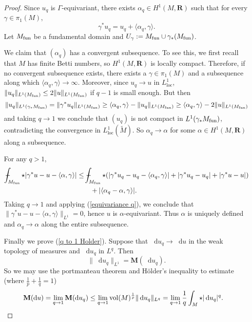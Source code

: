 \documentclass[reqno,11pt]{amsart}
\newcommand{\RR}{\mathbf{R}}
\newcommand*\dif{\mathop{}\!\mathrm{d}}
\newcommand{\vol}{\mathrm{vol}}
\newcommand{\Mass}{\mathbf M}
\newcommand{\loc}{\mathrm{loc}}
\theoremstyle{definition}
\numberwithin{equation}{section}
\def\Xint#1{\mathchoice
{\XXint\displaystyle\textstyle{#1}}%
{\XXint\textstyle\scriptstyle{#1}}%
{\XXint\scriptstyle\scriptscriptstyle{#1}}%
{\XXint\scriptscriptstyle\scriptscriptstyle{#1}}%
\!\int}
\def\XXint#1#2#3{{\setbox0=\hbox{$#1{#2#3}{\int}$ }
\vcenter{\hbox{$#2#3$ }}\kern-.6\wd0}}
\def\dashint{\Xint-}
\begin{document}
\begin{proof}
Since $u_q$ is $\Gamma$-equivariant, there exists $\alpha_q \in H^1(M, \RR)$ such that for every $\gamma \in \pi_1(M)$,
\begin{equation}\label{equivariance q}
	\gamma^* u_q = u_q + \langle \alpha_q, \gamma\rangle.
\end{equation}
Let $M_{\rm fun}$ be a fundamental domain and $U_\gamma := M_{\rm fun} \cup \gamma_* (M_{\rm fun})$.

We claim that $(\alpha_q)$ has a convergent subsequence.
To see this, we first recall that $M$ has finite Betti numbers, so $H^1(M, \RR)$ is locally compact.
Therefore, if no convergent subsequence exists, there exists a $\gamma \in \pi_1(M)$ and a subsequence along which $\langle \alpha_q, \gamma\rangle \to \infty$.
Moreover, since $u_q \to u$ in $L^1_\loc$, $\|u_q\|_{L^1(M_{\rm fun})} \leq 2\|u\|_{L^1(M_{\rm fun})}$ if $q - 1$ is small enough.
But then 
$$\|u_q\|_{L^1(\gamma_* M_{\rm fun})} = \|\gamma^* u_q\|_{L^1(M_{\rm fun})} \geq \langle \alpha_q, \gamma\rangle - \|u_q\|_{L^1(M_{\rm fun})} \geq \langle \alpha_q, \gamma\rangle - 2\|u\|_{L^1(M_{\rm fun})}$$
and taking $q \to 1$ we conclude that $(u_q)$ is not compact in $L^1(\gamma_* M_{\rm fun})$, contradicting the convergence in $L^1_\loc(\tilde M)$.
So $\alpha_q \to \alpha$ for some $\alpha \in H^1(M, \RR)$ along a subsequence.

For any $q > 1$,
\begin{align*}
\dashint_{M_{\rm fun}} \star |\gamma^* u - u - \langle \alpha, \gamma\rangle| 
&\leq \dashint_{M_{\rm fun}} \star (|\gamma^* u_q - u_q - \langle \alpha_q, \gamma\rangle| + |\gamma^* u_q - u_q| + |\gamma^* u - u|) \\
&\qquad + |\langle \alpha_q - \alpha, \gamma\rangle|.
\end{align*}
Taking $q \to 1$ and applying (\ref{equivariance q}), we conclude that $\|\gamma^* u - u - \langle \alpha, \gamma\rangle\|_{L^1} = 0$, hence $u$ is $\alpha$-equivariant.
Thus $\alpha$ is uniquely defined and $\alpha_q \to \alpha$ along the entire subsequence.

Finally we prove (\ref{q to 1 Holder}).
Suppose that $\dif u_q \to \dif u$ in the weak topology of measures and $\dif u_q$ in $L^q$.
Then
$$\|\dif u_q\|_{L^1} = \Mass(\dif u_q).$$
So we may use the portmanteau theorem and H\"older's inequality to estimate (where $\frac{1}{p} + \frac{1}{q} = 1$)
\begin{align*}
\Mass(\dif u) &= \lim_{q \to 1} \Mass(\dif u_q) \leq \lim_{q \to 1} \vol(M)^{\frac{1}{p}} \|\dif u_q\|_{L^q} = \lim_{q \to 1} \frac{1}{q} \int_M \star |\dif u_q|^q. \qedhere
\end{align*}
\end{proof}
\end{document}
